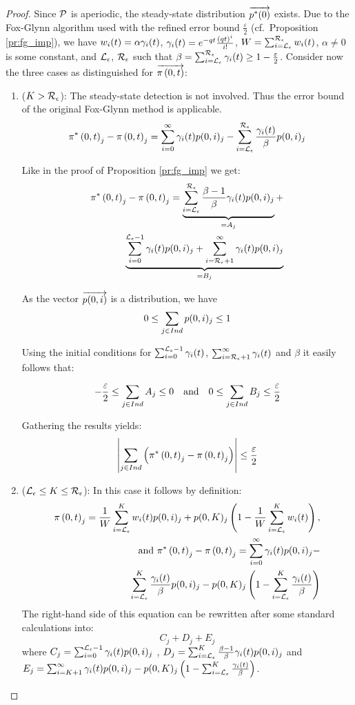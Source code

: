 \documentclass{entcs}
\begin{document}
		{\small
		\begin{proof}
			Since $\mathcal{P}$ is aperiodic, the steady-state distribution $\overrightarrow{p^{*}(0)}$ exists.  Due to the Fox-Glynn algorithm used with the refined error bound $\frac{\varepsilon}{2}$ (cf.\ Proposition \ref{pr:fg_imp}), we have $w_{i}(t) = \alpha \gamma_{i}(t)$, $\gamma_{i}(t) = e^{-q t}\frac{\left( q t \right)^{i}}{i!} $, $W = \sum_{i = \mathcal{L}_{\epsilon}}^{\mathcal{R}_{\epsilon}} w_{i}(t)$, $\alpha \neq 0$ is some constant, and $\mathcal{L}_{\epsilon}$, $\mathcal{R}_{\epsilon}$ such that $\beta = \sum_{i=\mathcal{L}_{\epsilon}}^{\mathcal{R}_{\epsilon}} \gamma_{i}(t) \geq 1 - \frac{\varepsilon}{2}$.
			Consider now the three cases as distinguished for $\overrightarrow{\pi \left(0, t \right )}$:
			\begin{enumerate}
					
				\item ($K > \mathcal{R}_{\epsilon}$):  The steady-state detection is not involved. Thus the error bound of the original Fox-Glynn method is applicable.
					\[
						\pi^{*} \left(0, t \right )_{j} - \pi \left(0, t \right )_{j} =\sum_{i=0}^{\infty} \gamma_{i}(t) p(0,i)_{j} - \sum_{i=\mathcal{L}_{\epsilon}}^{\mathcal{R}_{\epsilon}}\frac{\gamma_{i}(t)}{\beta} p(0,i)_{j}
					\]

					Like in the proof of Proposition \ref{pr:fg_imp} we get:
					\begin{eqnarray}
						\pi^{*} \left(0, t \right )_{j} - \pi \left(0, t \right )_{j} = \underbrace{\sum_{i=\mathcal{L}_{\epsilon}}^{\mathcal{R}_{\epsilon}}\frac{\beta - 1}{\beta} \gamma_{i}(t) p(0,i)_{j}}_{=A_{j}} + \nonumber \\
						\underbrace{\sum_{i=0}^{\mathcal{L}_{\epsilon}-1} \gamma_{i}(t) p(0,i)_{j} + 
						\sum_{i=\mathcal{R}_{\epsilon}+1}^{\infty} \gamma_{i}(t) p(0,i)_{j}}_{=B_{j}} \nonumber
					\end{eqnarray}
												
					As the vector $\overrightarrow{p(0,i)}$ is a distribution, we have \[ 0 \leq \sum_{j \in Ind} p(0,i)_{j} \leq 1 \]
					
					Using the initial conditions for $\sum_{i=0}^{\mathcal{L}_{\epsilon}-1} \gamma_{i}(t) $, $\sum_{i=\mathcal{R}_{\epsilon}+1}^{\infty} \gamma_{i}(t) $ and $\beta$ it easily follows that:
					
					\[
						- \frac{\varepsilon}{2} \leq \sum_{j \in Ind} A_{j} \leq 0 \quad
						\text{and} \quad
						0 \leq \sum_{j \in Ind} B_{j} \leq \frac{\varepsilon}{2}
					\]

					Gathering the results yields:
					\[
						\left| \sum_{j \in Ind} \left( \pi^{*} \left(0, t \right )_{j} - \pi \left(0, t \right )_{j} \right) \right| \leq \frac{\varepsilon}{2}
					\]
						
				\item ($\mathcal{L}_{\epsilon} \leq K \leq \mathcal{R}_{\epsilon}$): In this case it follows by definition:
					\begin{eqnarray}
						\pi \left(0, t \right )_{j} = \frac{1}{W} \sum_{i=\mathcal{L}_{\epsilon}}^{K}w_{i}(t) p(0,i)_{j} + 
						p(0,K)_{j} \left(1- \frac{1}{W} \sum_{i=\mathcal{L}_{\epsilon}}^{K}w_{i}(t) \right), \nonumber \\
						\text{and } \pi^{*} \left(0, t \right )_{j} - \pi \left(0, t \right )_{j} =\sum_{i=0}^{\infty} \gamma_{i}(t) p(0,i)_{j} - \nonumber \\
						\sum_{i=\mathcal{L}_{\epsilon}}^{K}\frac{\gamma_{i}(t)}{\beta} p(0,i)_{j} -
						p(0,K)_{j} \left(1 - \sum_{i=\mathcal{L}_{\epsilon}}^{K}\frac{\gamma_{i}(t)}{\beta} \right) \nonumber
					\end{eqnarray}
						The right-hand side of this equation can be rewritten after some standard calculations into:
					\[
						C_{j} + D_{j} + E_{j}
					\]
					where $C_{j} = \sum_{i=0}^{\mathcal{L}_{\epsilon}-1} \gamma_{i}(t) p(0,i)_{j}$ , $D_{j} = \sum_{i=\mathcal{L}_{\epsilon}}^{K} \frac{\beta - 1}{\beta} \gamma_{i}(t) p(0,i)_{j} $ and $E_{j} = \sum_{i=K+1}^{\infty}\gamma_{i}(t) p(0,i)_{j} - p(0,K)_{j} \left(1 -	\sum_{i=\mathcal{L}_{\epsilon}}^{K}\frac{\gamma_{i}(t)}{\beta} \right)$.
					

\end{enumerate}
\end{proof}}
\end{document}
